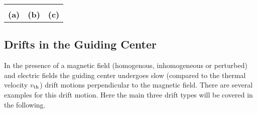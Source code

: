 \begin{center}
    \captionsetup{type=figure}
    \begin{tabular}{c c c}
         &
         & \hspace{-1cm}
        \\[0.3cm]
        \textbf{(a)} & \textbf{(b)} & \textbf{(c)} \\
    \end{tabular}
    \label{fig:perp-par-motion}
\end{center}

\newpage

\subsection{Drifts in the Guiding Center}
\label{sub:drift}

In the presence of a magnetic field (homogenous, inhomogeneous or perturbed) and electric fields the guiding center undergoes slow (compared to the thermal velocity $v_\mathrm{th}$) drift motions perpendicular to the magnetic field. There are several examples for this drift motion. Here the main three drift types will be covered in the following. 

